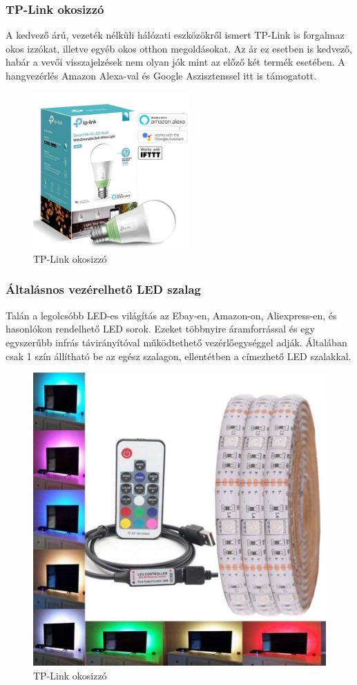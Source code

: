 \documentclass[../main.tex]{subfiles}
\begin{document}
        \subsubsection{TP-Link okosizzó}%
            A kedvező árú, vezeték nélküli hálózati eszközökről ismert TP-Link is forgalmaz okos izzókat, illetve egyéb okos otthon megoldásokat. Az ár ez esetben is kedvező, habár a vevői visszajelzések nem olyan jók mint az előző két termék esetében. A hangvezérlés Amazon Alexa-val és Google Aszisztenssel itt is támogatott.
            
            \begin{figure}[h!] 
                \centering
                    \includegraphics[height=6cm]{irodalom_res/tplink_bulb}
                \caption{TP-Link okosizzó}
                \label{fig:tplink_bulb}
             \end{figure}
        
        \subsubsection{Általásnos vezérelhető LED szalag} %
            Talán a legolcsóbb LED-es világítás az Ebay-en, Amazon-on, Aliexpress-en, és hasonlókon rendelhető LED sorok. Ezeket többnyire áramforrással és egy egyszerűbb infrás távirányítóval működtethető vezérlőegységgel adják. Általában csak 1 szín állítható be az egész szalagon, ellentétben a címezhető LED szalakkal. 
            
            \begin{figure}[h!] 
                \centering
                    \includegraphics[height=6 cm]{irodalom_res/std_ledstrip}
                \caption{TP-Link okosizzó}
                \label{fig:std_ledstrip}
             \end{figure}
        
\newpage
\end{document}
